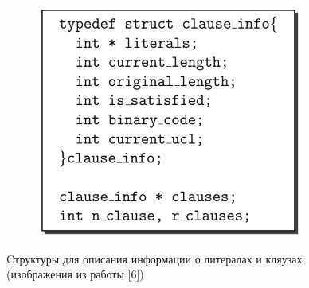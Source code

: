 \documentclass[aspectratio=169,xcolor=table,english]{beamer}
\begin{document}
\begin{frame}[fragile]
\begin{minipage}[m]{0.45\linewidth}
\begin{figure}
\begin{subfigure}[b]{0.49\textwidth}
                \includegraphics[width=0.95\textwidth]{figures/structure clause.png}
            \end{subfigure}
            \caption{Cтруктуры для описания информации о литералах и кляузах (изображения из работы [6])}
        \end{figure}
    \end{minipage}
\end{frame}
\end{document}
